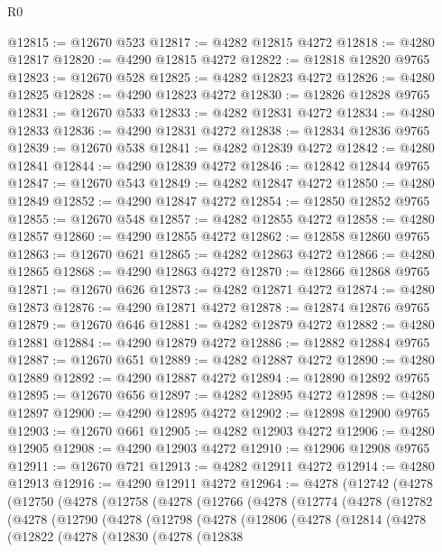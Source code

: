 \begin{lexlean}{R0}
\begin{coremodule}
@12815 := @12670 @523
@12817 := @4282 @12815 @4272
@12818 := @4280 @12817
@12820 := @4290 @12815 @4272
@12822 := @12818 @12820 @9765
@12823 := @12670 @528
@12825 := @4282 @12823 @4272
@12826 := @4280 @12825
@12828 := @4290 @12823 @4272
@12830 := @12826 @12828 @9765
@12831 := @12670 @533
@12833 := @4282 @12831 @4272
@12834 := @4280 @12833
@12836 := @4290 @12831 @4272
@12838 := @12834 @12836 @9765
@12839 := @12670 @538
@12841 := @4282 @12839 @4272
@12842 := @4280 @12841
@12844 := @4290 @12839 @4272
@12846 := @12842 @12844 @9765
@12847 := @12670 @543
@12849 := @4282 @12847 @4272
@12850 := @4280 @12849
@12852 := @4290 @12847 @4272
@12854 := @12850 @12852 @9765
@12855 := @12670 @548
@12857 := @4282 @12855 @4272
@12858 := @4280 @12857
@12860 := @4290 @12855 @4272
@12862 := @12858 @12860 @9765
@12863 := @12670 @621
@12865 := @4282 @12863 @4272
@12866 := @4280 @12865
@12868 := @4290 @12863 @4272
@12870 := @12866 @12868 @9765
@12871 := @12670 @626
@12873 := @4282 @12871 @4272
@12874 := @4280 @12873
@12876 := @4290 @12871 @4272
@12878 := @12874 @12876 @9765
@12879 := @12670 @646
@12881 := @4282 @12879 @4272
@12882 := @4280 @12881
@12884 := @4290 @12879 @4272
@12886 := @12882 @12884 @9765
@12887 := @12670 @651
@12889 := @4282 @12887 @4272
@12890 := @4280 @12889
@12892 := @4290 @12887 @4272
@12894 := @12890 @12892 @9765
@12895 := @12670 @656
@12897 := @4282 @12895 @4272
@12898 := @4280 @12897
@12900 := @4290 @12895 @4272
@12902 := @12898 @12900 @9765
@12903 := @12670 @661
@12905 := @4282 @12903 @4272
@12906 := @4280 @12905
@12908 := @4290 @12903 @4272
@12910 := @12906 @12908 @9765
@12911 := @12670 @721
@12913 := @4282 @12911 @4272
@12914 := @4280 @12913
@12916 := @4290 @12911 @4272
@12964 := @4278
    (@12742
      (@4278
        (@12750
          (@4278
            (@12758
              (@4278
                (@12766
                  (@4278
                    (@12774
                      (@4278
                        (@12782
                          (@4278
                            (@12790
                              (@4278
                                (@12798
                                  (@4278
                                    (@12806
                                      (@4278
                                        (@12814
                                          (@4278
                                            (@12822
                                              (@4278
                                                (@12830
                                                  (@4278
                                                    (@12838

\end{coremodule}
\end{lexlean}
